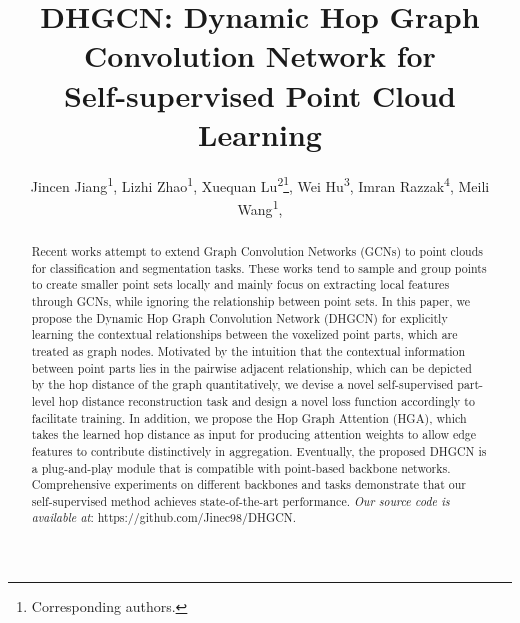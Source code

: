 \documentclass[letterpaper]{article}
\title{DHGCN: Dynamic Hop Graph Convolution Network for \\Self-supervised Point Cloud Learning}
\author{
Jincen Jiang\textsuperscript{\rm 1}\equalcontrib,
Lizhi Zhao\textsuperscript{\rm 1}\equalcontrib,
Xuequan Lu\textsuperscript{\rm 2}\thanks{Corresponding authors.},
Wei Hu\textsuperscript{\rm 3},
Imran Razzak\textsuperscript{\rm 4},
Meili Wang\textsuperscript{\rm 1}\footnotemark[2],
}
\begin{document}
\maketitle

\begin{abstract}
Recent works attempt to extend Graph Convolution Networks (GCNs) to point clouds for classification and segmentation tasks. These works tend to sample and group points to create smaller point sets locally and mainly focus on extracting local features through GCNs, while ignoring the relationship between point sets. In this paper, we propose the Dynamic Hop Graph Convolution Network (DHGCN) for explicitly learning the contextual relationships between the voxelized point parts, which are treated as graph nodes. Motivated by the intuition that the contextual information between point parts lies in the pairwise adjacent relationship, which can be depicted by the hop distance of the graph quantitatively, we devise a novel self-supervised part-level hop distance reconstruction task and design a novel loss function accordingly to facilitate training. In addition, we propose the Hop Graph Attention (HGA), which takes the learned hop distance as input for producing attention weights to allow edge features to contribute distinctively in aggregation. Eventually, the proposed DHGCN is a plug-and-play module that is compatible with point-based backbone networks. Comprehensive experiments on different backbones and tasks demonstrate that our self-supervised method achieves state-of-the-art performance. \textit{Our source code is available at}: https://github.com/Jinec98/DHGCN.
\end{abstract}
\end{document}
